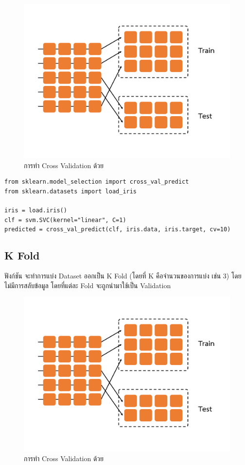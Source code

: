 \begin{figure}[H]
    \centering
    \includegraphics[width=0.9\linewidth,page=3]{fig/cross_validation.pdf}
    \caption{การทำ Cross Validation ด้วย }
    \label{fig:cross_val_predict}
\end{figure}

\begin{lstlisting}[style=MyPython]
from sklearn.model_selection import cross_val_predict
from sklearn.datasets import load_iris

iris = load.iris()
clf = svm.SVC(kernel="linear", C=1)
predicted = cross_val_predict(clf, iris.data, iris.target, cv=10)
\end{lstlisting}

\subsection{K Fold}
\label{ssec:f_fold}

ฟังก์ชัน  จะทำการแบ่ง Dataset ออกเป็น K Fold (โดยที่ K คือจำนวนของการแบ่ง เช่น 3) โดยไม่มีการสลับข้อมูล 
โดยที่แต่ละ Fold จะถูกนำมาใช้เป็น Validation

\begin{figure}[H]
    \centering
    \includegraphics[width=0.9\linewidth,page=4]{fig/cross_validation.pdf}
    \caption{การทำ Cross Validation ด้วย }
    \label{fig:f_fold}
\end{figure}

